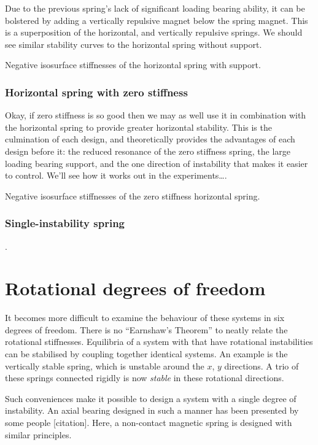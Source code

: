 Due to the previous spring's lack of significant loading bearing ability, it
can be bolstered by adding a vertically repulsive magnet below the spring
magnet. This is a superposition of the horizontal, and vertically repulsive
springs. We should see similar stability curves to the horizontal spring
without support.

  {Negative isosurface stiffnesses of the horizontal spring with support.}

\subsubsection{Horizontal spring with zero stiffness}

Okay, if zero stiffness is so good then we may as well use it in combination
with the horizontal spring to provide greater horizontal stability. This is
the culmination of each design, and theoretically provides the advantages of
each design before it: the reduced resonance of the zero stiffness spring, the
large loading bearing support, and the one direction of instability that makes
it easier to control. We'll see how it works out in the experiments\dots.

  {Negative isosurface stiffnesses of the zero stiffness horizontal spring.}


\subsubsection{Single-instability spring}

\cite{choi2003}. 

\section{Rotational degrees of freedom}

It becomes more difficult to examine the behaviour of these systems in
six degrees of freedom. There is no ``Earnshaw's Theorem'' to neatly
relate the rotational stiffnesses. Equilibria of a system with that
have rotational instabilities can be stabilised by coupling together
identical systems. An example is the vertically stable spring, which
is unstable around the $x$, $y$ directions. A trio of these springs
connected rigidly is now \emph{stable} in these rotational directions.

Such conveniences make it possible to design a system with a single
degree of instability. An axial bearing designed in such a manner has
been presented by some people [citation]. Here, a non-contact magnetic
spring is designed with similar principles.

